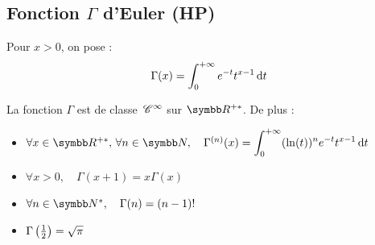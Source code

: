 \subsection{\texorpdfstring{Fonction $\Gamma$ d'Euler (HP)}{Fonction Gamma d'Euler (HP)}}

\begin{definitionnt}{}{}
    Pour $x > 0$, on pose :
    \[ \Gamma(x) = \int_0^{+\infty} e^{-t} t^{x-1} \,\mathrm{d}t \]
\end{definitionnt}


\begin{theorement}{}{}
    La fonction $\Gamma$ est de classe $\,\mathscr C^{\infty}$ sur $\R^{+*}$. De plus :
    \begin{itemize}
        \item $\forall x \in \R^{+*}, \, \forall n \in \N, \quad \Gamma^{(n)}(x) = \ds\int_0^{+\infty} (\ln(t))^n e^{-t} t^{x-1} \dt$
        \item $\forall x > 0, \quad \Gamma(x+1) = x \Gamma(x)$
        \item $\forall n \in \N^*, \quad \Gamma(n) = (n-1)!$
        \item $\Gamma\left(\frac{1}{2}\right) = \sqrt{\pi}$
    \end{itemize}
\end{theorement}

